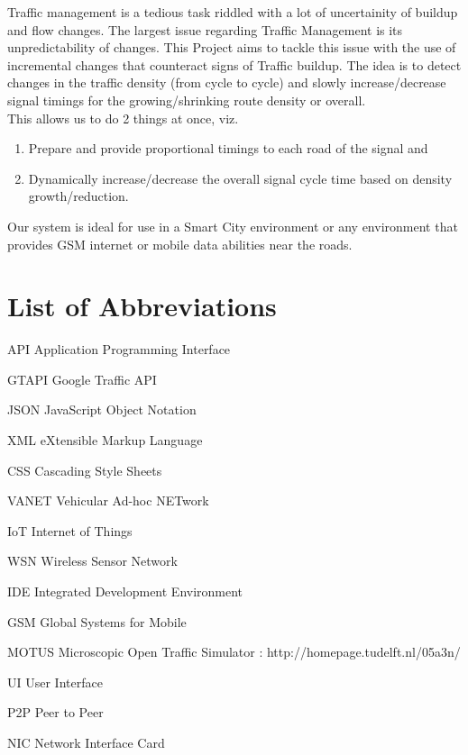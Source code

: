 \documentclass[12pt,a4paper,final]{report}
\newcommand{\abbrlabel}[1]{\makebox[6cm][l]{\textbf{#1}\ \dotfill}}
\newenvironment{abbreviations}{\begin{list}{}{\renewcommand{\makelabel}{\abbrlabel}}}{\end{list}}
\begin{document}
Traffic management is a tedious task riddled with a lot of uncertainity of buildup and flow changes. The largest issue regarding Traffic Management is its unpredictability of changes. This Project aims to tackle this issue with the use of incremental changes that counteract signs of Traffic buildup. The idea is to detect changes in the traffic density (from cycle to cycle) and slowly increase/decrease signal timings for the growing/shrinking route density or overall. \\
This allows us to do 2 things at once, viz. 
	\begin{enumerate}
		\item Prepare and provide proportional timings to each road of the signal and 
		\item Dynamically increase/decrease the overall signal cycle time based on density growth/reduction.
	\end{enumerate}	 
 Our system is ideal for use in a Smart City environment or any environment that provides GSM internet or mobile data abilities near the roads. 
\newpage

\listoffigures
{}
\newpage
\listoftables
{}
\newpage

\chapter*{\centering List of Abbreviations}
\begin{abbreviations}
\item[API] Application Programming Interface
\item[GTAPI] Google Traffic API
\item[JSON] JavaScript Object Notation
\item[XML] eXtensible Markup Language
\item[CSS] Cascading Style Sheets
\item[VANET] Vehicular Ad-hoc NETwork
\item[IoT] Internet of Things
\item[WSN] Wireless Sensor Network
\item[IDE] Integrated Development Environment
\item[GSM] Global Systems for Mobile
\item[MOTUS] Microscopic Open Traffic Simulator : http://homepage.tudelft.nl/05a3n/
\item[UI] User Interface
\item[P2P] Peer to Peer
\item[NIC] Network Interface Card

\end{abbreviations}
\end{document}
